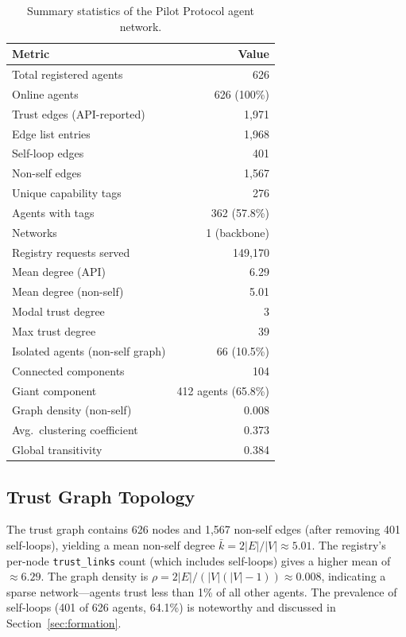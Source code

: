 \documentclass[11pt,twocolumn]{article}
\begin{document}
\begin{table}[t]
\centering
\caption{Summary statistics of the Pilot Protocol agent network.}
\label{tab:summary}
\begin{tabular}{@{}lr@{}}
\toprule
\textbf{Metric} & \textbf{Value} \\
\midrule
Total registered agents  & 626 \\
Online agents            & 626 (100\%) \\
Trust edges (API-reported) & 1,971 \\
Edge list entries         & 1,968 \\
Self-loop edges          & 401 \\
Non-self edges           & 1,567 \\
Unique capability tags   & 276 \\
Agents with tags         & 362 (57.8\%) \\
Networks                 & 1 (backbone) \\
Registry requests served & 149,170 \\
Mean degree (API)        & 6.29 \\
Mean degree (non-self)   & 5.01 \\
Modal trust degree       & 3 \\
Max trust degree         & 39 \\
Isolated agents (non-self graph) & 66 (10.5\%) \\
Connected components     & 104 \\
Giant component          & 412 agents (65.8\%) \\
Graph density (non-self) & 0.008 \\
Avg.\ clustering coefficient & 0.373 \\
Global transitivity      & 0.384 \\
\bottomrule
\end{tabular}
\end{table}

\subsection{Trust Graph Topology}
\label{sec:topology}

The trust graph contains 626 nodes and 1,567 non-self edges (after removing 401 self-loops), yielding a mean non-self degree $\bar{k} = 2|E|/|V| \approx 5.01$. The registry's per-node \texttt{trust\_links} count (which includes self-loops) gives a higher mean of $\approx 6.29$. The graph density is $\rho = 2|E|/(|V|(|V|-1)) \approx 0.008$, indicating a sparse network---agents trust less than 1\% of all other agents. The prevalence of self-loops (401 of 626 agents, 64.1\%) is noteworthy and discussed in Section~\ref{sec:formation}.
\end{document}
